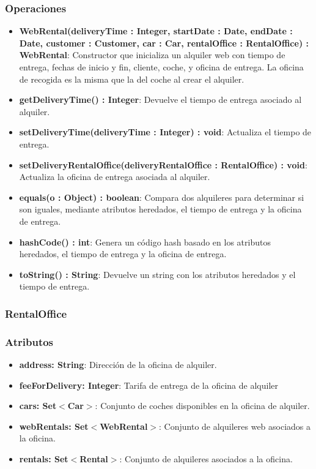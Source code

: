 \subsubsection*{Operaciones}

\begin{itemize}
    \item \textbf{WebRental(deliveryTime : Integer, startDate : Date, endDate : Date, customer : Customer, car : Car, rentalOffice : RentalOffice) : WebRental}: 
    Constructor que inicializa un alquiler web con tiempo de entrega, fechas de inicio y fin, cliente, coche, y oficina de entrega. La oficina de recogida es la misma que la del coche al crear el alquiler.

    \item \textbf{getDeliveryTime() : Integer}: Devuelve el tiempo de entrega asociado al alquiler.
    \item \textbf{setDeliveryTime(deliveryTime : Integer) : void}: Actualiza el tiempo de entrega. 
    \item \textbf{setDeliveryRentalOffice(deliveryRentalOffice : RentalOffice) : void}: Actualiza la oficina de entrega asociada al alquiler.
    \item \textbf{equals(o : Object) : boolean}: Compara dos alquileres para determinar si son iguales, mediante atributos heredados, el tiempo de entrega y la oficina de entrega.
    \item \textbf{hashCode() : int}: Genera un código hash basado en los atributos heredados, el tiempo de entrega y la oficina de entrega.
    \item \textbf{toString() : String}: Devuelve un string con los atributos heredados y el tiempo de entrega.
\end{itemize}

\subsubsection{RentalOffice}

\subsubsection*{Atributos}

\begin{itemize}
    \item \textbf{address: String}: Dirección de la oficina de alquiler. 
    \item \textbf{feeForDelivery: Integer}: Tarifa de entrega de la oficina de alquiler
    \item \textbf{cars: Set$<$Car$>$}: Conjunto de coches disponibles en la oficina de alquiler.
    \item \textbf{webRentals: Set$<$WebRental$>$}: Conjunto de alquileres web asociados a la oficina. 
    \item \textbf{rentals: Set$<$Rental$>$}: Conjunto de alquileres asociados a la oficina.
\end{itemize}


